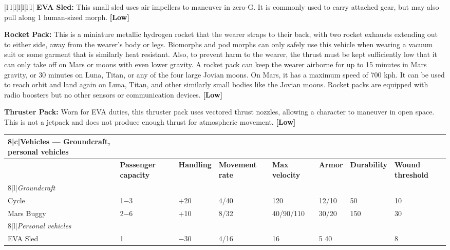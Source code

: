 \begin{tabular}{|l|l|l|l|l|l|l|}
\textbf{EVA Sled:} This small sled uses air impellers to maneuver in zero-G. It is commonly used to carry attached gear, but may also pull along 1 human-sized morph. \textbf{[Low]} 

\textbf{Rocket Pack:} This is a miniature metallic hydrogen rocket that the wearer straps to their back, with two rocket exhausts extending out to either side, away from the wearer’s body or legs. Biomorphs and pod morphs can only safely use this vehicle when wearing a vacuum suit or some garment that is similarly heat resistant. Also, to prevent harm to the wearer, the thrust must be kept sufficiently low that it can only take off on Mars or moons with even lower gravity. A rocket pack can keep the wearer airborne for up to 15 minutes in Mars gravity, or 30 minutes on Luna, Titan, or any of the four large Jovian moons. On Mars, it has a maximum speed of 700 kph. It can be used to reach orbit and land again on Luna, Titan, and other similarly small bodies like the Jovian moons. Rocket packs are equipped with radio boosters but no other sensors or communication devices. \textbf{[Low]} 

\textbf{Thruster Pack:} Worn for EVA duties, this thruster pack uses vectored thrust nozzles, allowing a character to maneuver in open space. This is not a jetpack and does not produce enough thrust for atmospheric movement. \textbf{[Low]} 

\begin{table} \begin{tabularx}{\hline}{|l|X|X|X|X|X|X|X|} \hline

\hline{8}{|c|}{\textbf{Vehicles --- Groundcraft, personal vehicles}} \\ \hline

&\textbf{Passenger capacity}	&\textbf{Handling}	&\textbf{Movement rate}	&\textbf{Max velocity}	&\textbf{Armor}	&\textbf{Durability}	&\textbf{Wound threshold} \\ \hline

\hline{8}{|l|}{\emph{Groundcraft}} \\ \hline

Cycle	&1$-$3	&+20	&4/40	&120	&12/10	&50	&10 \\ \hline

Mars Buggy	&2$-$6	&+10	&8/32	&40/90/110	&30/20	&150	&30 \\ \hline

\hline{8}{|l|}{\emph{Personal vehicles}} \\ \hline

EVA Sled	&1	&$-$30	&4/16	&16	&5 40	&&8 \\ \hline


\end{tabularx}
\end{table}
\end{tabular}
